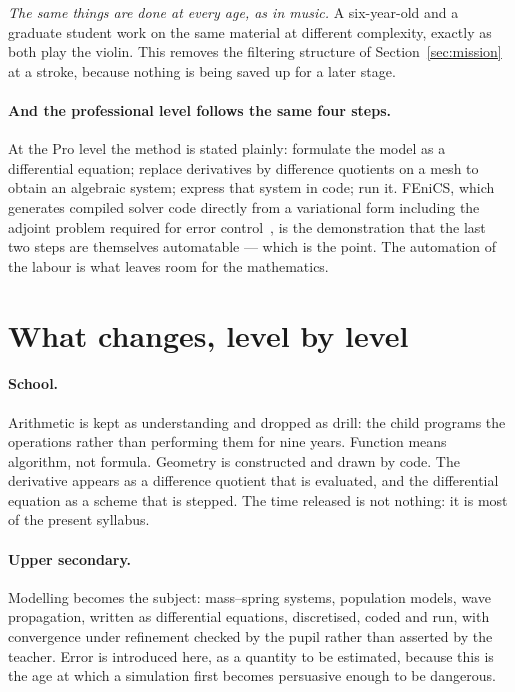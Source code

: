 \documentclass[11pt]{article}
\begin{document}
\emph{The same things are done at every age, as in music.} A six-year-old and a graduate student
work on the same material at different complexity, exactly as both play the violin. This removes the
filtering structure of Section~\ref{sec:mission} at a stroke, because nothing is being saved up for
a later stage.

\paragraph{And the professional level follows the same four steps.} At the Pro level the method is
stated plainly: formulate the model as a differential equation; replace derivatives by difference
quotients on a mesh to obtain an algebraic system; express that system in code; run it. FEniCS,
which generates compiled solver code directly from a variational form including the adjoint problem
required for error control~\cite{fenics}, is the demonstration that the last two steps are
themselves automatable --- which is the point. The automation of the labour is what leaves room for
the mathematics.

\section{What changes, level by level}\label{sec:levels}

\paragraph{School.} Arithmetic is kept as understanding and dropped as drill: the child programs the
operations rather than performing them for nine years. Function means algorithm, not formula.
Geometry is constructed and drawn by code. The derivative appears as a difference quotient that is
evaluated, and the differential equation as a scheme that is stepped. The time released is not
nothing: it is most of the present syllabus.

\paragraph{Upper secondary.} Modelling becomes the subject: mass--spring systems, population models,
wave propagation, written as differential equations, discretised, coded and run, with convergence
under refinement checked by the pupil rather than asserted by the teacher. Error is introduced here,
as a quantity to be estimated, because this is the age at which a simulation first becomes
persuasive enough to be dangerous.
\end{document}
